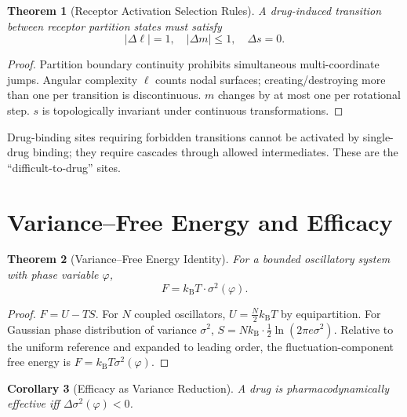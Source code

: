 \documentclass[twocolumn,10pt,a4paper]{article}
\newtheorem{theorem}{Theorem}[section]
\newtheorem{corollary}[theorem]{Corollary}
\theoremstyle{definition}
\theoremstyle{remark}
\newcommand{\kB}{k_{\mathrm{B}}}
\begin{document}
\begin{theorem}[Receptor Activation Selection Rules]
A drug-induced transition between receptor partition states must satisfy
\begin{equation}
    |\Delta\ell| = 1,\quad |\Delta m|\leq 1,\quad \Delta s = 0.
\end{equation}
\end{theorem}

\begin{proof}
Partition boundary continuity prohibits simultaneous multi-coordinate jumps. Angular complexity $\ell$ counts nodal surfaces; creating/destroying more than one per transition is discontinuous. $m$ changes by at most one per rotational step. $s$ is topologically invariant under continuous transformations.
\end{proof}

Drug-binding sites requiring forbidden transitions cannot be activated by single-drug binding; they require cascades through allowed intermediates. These are the ``difficult-to-drug'' sites.

\section{Variance--Free Energy and Efficacy}

\begin{theorem}[Variance--Free Energy Identity]
For a bounded oscillatory system with phase variable $\varphi$,
\begin{equation}
    F = \kB T\cdot\sigma^2(\varphi).
    \label{eq:varfree}
\end{equation}
\end{theorem}

\begin{proof}
$F = U - TS$. For $N$ coupled oscillators, $U = \tfrac{N}{2}\kB T$ by equipartition. For Gaussian phase distribution of variance $\sigma^2$, $S = N\kB\cdot\tfrac{1}{2}\ln(2\pi e\sigma^2)$. Relative to the uniform reference and expanded to leading order, the fluctuation-component free energy is $F = \kB T\sigma^2(\varphi)$.
\end{proof}

\begin{corollary}[Efficacy as Variance Reduction]
A drug is pharmacodynamically effective iff $\Delta\sigma^2(\varphi) < 0$.
\end{corollary}
\end{document}

